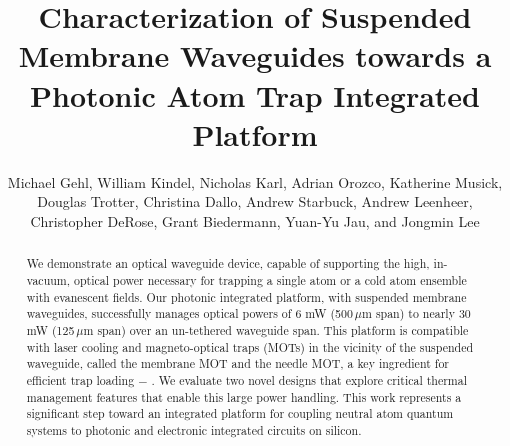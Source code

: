 \documentclass{osa-article}
\begin{document}
\title{Characterization of Suspended Membrane Waveguides towards a Photonic Atom Trap Integrated Platform}

\author{
Michael Gehl,
William Kindel,
Nicholas Karl,
Adrian Orozco,
Katherine Musick,
Douglas Trotter,
Christina Dallo,
Andrew Starbuck,
Andrew Leenheer,
Christopher DeRose,
Grant Biedermann,
Yuan-Yu Jau, and
Jongmin Lee}

\address{
Sandia National Laboratories, Albuquerque, New Mexico 87185, USA\\
Department of Physics and Astronomy, University of New Mexico,  Albuquerque, NM 87106, USA\\
Department of Physics and Astronomy, University of Oklahoma, Norman, Oklahoma 73019, USA}




\begin{abstract}
We demonstrate an optical waveguide device, capable of supporting the high, in-vacuum, optical power necessary for trapping a single atom or a cold atom ensemble with evanescent fields. Our photonic integrated platform, with suspended membrane waveguides, successfully manages optical powers of 6 mW (500\,$\mu$m span) to nearly 30 mW (125\,$\mu$m span) over an un-tethered waveguide span.  This platform is compatible with laser cooling and magneto-optical traps (MOTs) in the vicinity of the suspended waveguide, called the membrane MOT and the needle MOT, a key ingredient for efficient trap loading $-$ \cite{Lee20, Jau17}.  We evaluate two novel designs that explore critical thermal management features that enable this large power handling. This work represents a significant step toward an integrated platform for coupling neutral atom quantum systems to photonic and electronic integrated circuits on silicon.
\end{abstract}

\end{document}

